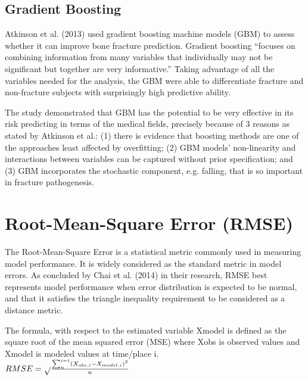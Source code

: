 \documentclass[10pt,11pt,12pt,oneside]{book}
\begin{document}
        \subsection{Gradient Boosting}
        Atkinson et al. (2013) used gradient boosting machine models (GBM) to assess whether it can improve bone fracture prediction. Gradient boosting “focuses on combining information from many variables that individually may not be significant but together are very informative.” Taking advantage of all the variables needed for the analysis, the GBM were able to differentiate fracture and non-fracture subjects with surprisingly high predictive ability.

        The study demonstrated that GBM has the potential to be very effective in its risk predicting in terms of the medical fields, precisely because of 3 reasons as stated by Atkinson et al.: (1) there is evidence that boosting methods are one of the approaches least affected by overfitting; (2) GBM models’ non-linearity and interactions between variables can be captured without prior specification; and (3) GBM incorporates the stochastic component, e.g. falling, that is so important in fracture pathogenesis. \cite{Atkinson2012}
    \section{Root-Mean-Square Error (RMSE)}
    The Root-Mean-Square Error is a statistical metric commonly used in measuring model performance. It is widely considered as the standard metric in model errors. As concluded by Chai et al. (2014) in their research, RMSE best represents model performance when error distribution is expected to be normal, and that it satisfies the triangle inequality requirement to be considered as a distance metric.
    
The formula, with respect to the estimated variable Xmodel is defined as the square root of the mean squared error (MSE) where Xobs is observed values and Xmodel is modeled values at time/place i.\\
    \begingroup
\Large
    \begin{math}
\centering
RMSE = \sqrt{}\frac{\sum_{n}^{i=1}\left ( X_{obs,i} - X_{model,i}\right )^{2}}{n}
\end{math}\\
\endgroup
\end{document}
